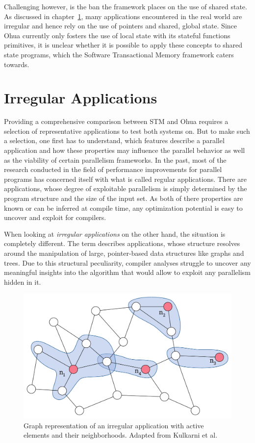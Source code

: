 Challenging however, is the ban the framework places on the use of shared state.
As discussed in chapter~\ref{sec:background:irregular}, many applications encountered in the real world are irregular and hence rely on the use of pointers and shared, global state.
Since Ohua currently only fosters the use of local state with its stateful functions primitives, it is unclear whether it is possible to apply these concepts to shared state programs, which the Software Transactional Memory framework caters towards.


\section{Irregular Applications}
\label{sec:background:irregular}

Providing a comprehensive comparison between STM and Ohua requires a selection of representative applications to test both systems on.
But to make such a selection, one first has to understand, which features describe a parallel application and how these properties may influence the parallel behavior as well as the viability of certain parallelism frameworks.
In the past, most of the research conducted in the field of performance improvements for parallel programs has concerned itself with what is called regular applications.
There are applications, whose degree of exploitable parallelism is simply determined by the program structure and the size of the input set.
As both of there properties are known or can be inferred at compile time, any optimization potential is easy to uncover and exploit for compilers.

When looking at \emph{irregular applications} on the other hand, the situation is completely different.
The term describes applications, whose structure resolves around the manipulation of large, pointer-based data structures like graphs and trees.
Due to this structural peculiarity, compiler analyses struggle to uncover any meaningful insights into the algorithm that would allow to exploit any parallelism hidden in it.

\begin{figure}[b]
    \includegraphics[width=.7\textwidth,keepaspectratio]{gfx/background-irregular}
    \caption{Graph representation of an irregular application with active elements and their neighborhoods. Adapted from Kulkarni et al.~\cite{kulkarni2009much}}%
    \label{fig:background:irregular}
\end{figure}

